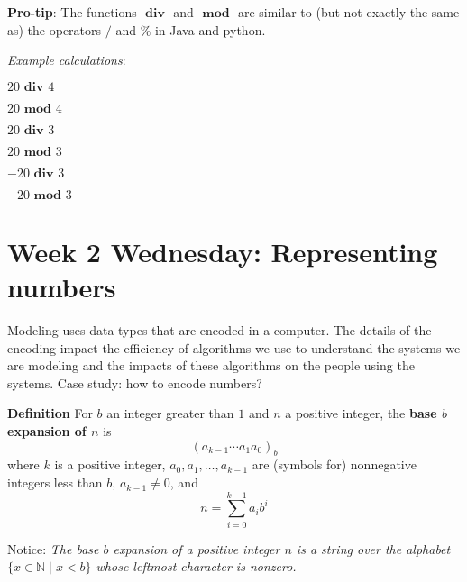 \documentclass[12pt, oneside]{article}
\newcommand{\st}{\mid}
\begin{document}
{\bf Pro-tip}: The functions $\textbf{ div }$ and $\textbf{ mod }$ are similar to (but not exactly the same as) 
the operators $/$ and $\%$ in Java and python.

\vfill

{\it Example calculations}:

$20 \textbf{ div } 4$

\vspace{20pt}

$20 \textbf{ mod } 4$

\vspace{20pt}

$20 \textbf{ div } 3$

\vspace{20pt}

$20 \textbf{ mod } 3$

\vspace{20pt}

$-20 \textbf{ div } 3$

\vspace{20pt}

$-20 \textbf{ mod } 3$

\vfill 

\section*{Week 2 Wednesday: Representing numbers}


Modeling uses data-types that are encoded in a computer.
The details of the encoding impact the efficiency of algorithms
we use to understand the systems we are modeling and the 
impacts of these algorithms on the people using the systems.
Case study: how to encode numbers?

\vfill 

{\bf Definition} For $b$ an integer greater than $1$ and $n$ a positive integer, 
the {\bf base $b$ expansion of $n$}  is
\[
(a_{k-1} \cdots a_1 a_0)_b
\]
where $k$ is a positive integer, $a_0, a_1, \ldots, a_{k-1}$ 
are (symbols for) nonnegative integers less than $b$, $a_{k-1} \neq  0$, and
\[
n =  \sum_{i=0}^{k-1} a_{i} b^{i}
\]

Notice: {\it The base $b$ expansion of a positive integer $n$ is a string over the alphabet 
$\{x \in \mathbb{N} \st x < b\}$
whose leftmost character is nonzero.}
\end{document}

